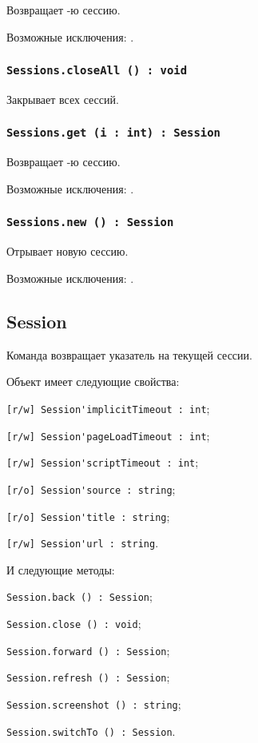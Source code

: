 Возвращает -ю сессию.

Возможные исключения: .

\subsubsection{\lstinline|Sessions.closeAll () : void|}

Закрывает всех сессий.

\subsubsection{\lstinline|Sessions.get (i : int) : Session|}

Возвращает -ю сессию.

Возможные исключения: .

\subsubsection{\lstinline|Sessions.new () : Session|}

Отрывает новую сессию.

Возможные исключения: .

\subsection{{\color{orange} Session}}

Команда \session{} возвращает указатель на текущей сессии.

Объект \session{} имеет следующие свойства:
\begin{icItems}
	\item \lstinline|[r/w] Session'implicitTimeout : int|;
	\item \lstinline|[r/w] Session'pageLoadTimeout : int|;
	\item \lstinline|[r/w] Session'scriptTimeout : int|;
	\item \lstinline|[r/o] Session'source : string|;
	\item \lstinline|[r/o] Session'title : string|;
	\item \lstinline|[r/w] Session'url : string|.
\end{icItems}

И следующие методы:
\begin{icItems}
	\item \lstinline|Session.back () : Session|;
	\item \lstinline|Session.close () : void|;
	\item \lstinline|Session.forward () : Session|;
	\item \lstinline|Session.refresh () : Session|;
	\item \lstinline|Session.screenshot () : string|;
	\item \lstinline|Session.switchTo () : Session|.
\end{icItems}


